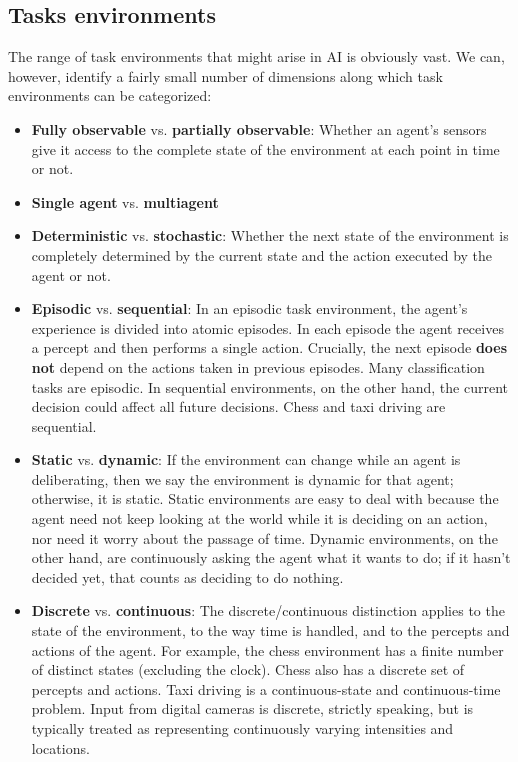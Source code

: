 \subsection{Tasks environments}
The range of task environments that might arise in AI is obviously vast. We can, however, identify a fairly small number of dimensions along which task environments can be categorized:
\begin{itemize}
    \item \textbf{Fully observable} vs. \textbf{partially observable}: Whether an agent’s sensors give it access to the complete state of the environment at each point in time or not.

    \item \textbf{Single agent} vs. \textbf{multiagent}

    \item \textbf{Deterministic} vs. \textbf{stochastic}: Whether the next state of the environment is completely determined by the current state and the action executed by the agent or not.

    \item \textbf{Episodic} vs. \textbf{sequential}: In an episodic task environment, the agent’s experience is divided into atomic episodes. In each episode the agent receives a percept and then performs a single action. Crucially, the next episode \textbf{does not} depend on the actions taken in previous episodes. Many classification tasks are episodic. In sequential environments, on the other hand, the current decision could affect all future decisions. Chess and taxi driving are sequential.

    \item \textbf{Static} vs. \textbf{dynamic}: If the environment can change while an agent is deliberating, then we say the environment is dynamic for that agent; otherwise, it is static. Static environments are easy to deal with because the agent need not keep looking at the world while it is deciding on an action, nor need it worry about the passage of time. Dynamic environments, on the other hand, are continuously asking the agent what it wants to do; if it hasn’t decided yet, that counts as deciding to do nothing.

    \item \textbf{Discrete} vs. \textbf{continuous}: The discrete/continuous distinction applies to the state of the environment, to the way time is handled, and to the percepts and actions of the agent. For example, the chess environment has a finite number of distinct states (excluding the clock). Chess also has a discrete set of percepts and actions. Taxi driving is a continuous-state and continuous-time problem.  Input from digital cameras is discrete, strictly speaking, but is typically treated as representing continuously varying intensities and locations.


\end{itemize}

